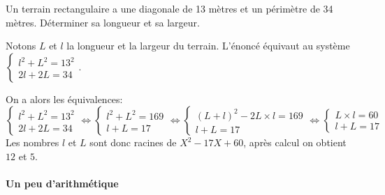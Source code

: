 \begin{exo}
Un terrain rectangulaire a une diagonale de 13 mètres et un périmètre de 34 mètres. Déterminer sa longueur et sa largeur. 
\begin{sol}
Notons $L$ et $l$ la longueur et la largeur du terrain. L'énoncé équivaut au système $\begin{cases}
l^2+L^2 = 13^2\\
2l+2L = 34
\end{cases}$.

On a alors les équivalences:
\[
\begin{cases}
l^2+L^2 = 13^2\\
2l+2L = 34
\end{cases}
\iff
\begin{cases}
l^2+L^2 = 169\\
l+L = 17
\end{cases}
\iff
\begin{cases}
(L+l)^2-2L\times l = 169\\
l+L = 17
\end{cases}
\iff
\begin{cases}
L\times l = 60\\
l+L = 17
\end{cases}
\]
Les nombres $l$ et $L$ sont donc racines de $X^2-17X+60$, après calcul on obtient $12$ et $5$.
\end{sol}
\end{exo}


\paragraph{Un peu d'arithmétique}\hfill

